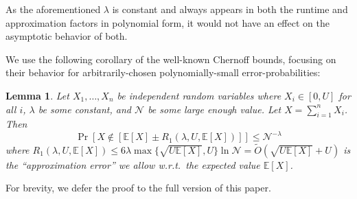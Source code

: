 \documentclass[letterpaper]{article} %
\newtheorem{lemma}[theorem]{Lemma}
\theoremstyle{definition}
\newcommand{\NN}{\mathcal{N}}
\newcommand{\EE}{\mathbb{E}}
\begin{document}
As the aforementioned $\lambda$ is constant and always appears in both the runtime and approximation factors in polynomial form, it would not have an effect on the asymptotic behavior of both. 



We use the following corollary of the well-known Chernoff bounds, focusing on their behavior for arbitrarily-chosen polynomially-small error-probabilities: 

\begin{lemma}\label{cor:2}
	Let $X_1,\ldots,X_n$ be independent random variables where $X_i \in [0,U]$ for all $i$, $\lambda$ be some constant, and $\NN$ be some large enough value. Let $X=\sum_{i=1}^n X_i$. Then
	\begin{equation*}
	\Pr[X \notin [\EE[X] \pm  R_1(\lambda, U,\EE[X]) ] ]  
	\leq \NN^{-\lambda}
	\end{equation*}
	where $R_1(\lambda, U,\EE[X]) \leq 6\lambda \max\{\sqrt{U \EE[X]}, U\}\ln \NN = 
	 \widetilde{O}(\sqrt{U \EE[X] } + U) $ is the ``approximation error'' we allow w.r.t.\ the expected value $\EE[X]$.
\end{lemma}	
For brevity, we defer the proof to the full version of this paper.


\end{document}
